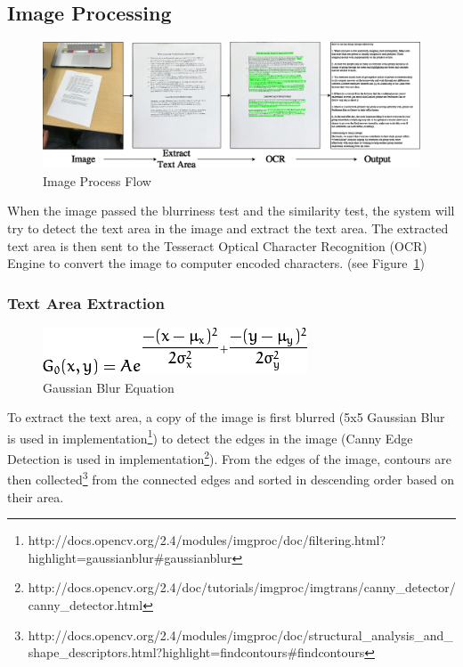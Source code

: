 \subsection{Image Processing}
\begin{figure}
	\centering
    \includegraphics[scale = 0.4]{ImageProcess.png}
    
    \caption{Image Process Flow}
	\label{imageProcessFlow}
\end{figure}
When the image passed the blurriness test and the similarity test, the system will try to detect the text area in the image and extract the text area. The extracted text area is then sent to the Tesseract Optical Character Recognition (OCR) Engine to convert the image to computer encoded characters. (see Figure~\ref{imageProcessFlow})

\subsubsection{Text Area Extraction}
\begin{figure}
	\centering
    \includegraphics[scale = 1]{gaussianBlur.png}
    
    \caption{Gaussian Blur Equation}
	\label{GaussianBlurEquation}
\end{figure}
To extract the text area, a copy of the image is first blurred (5x5 Gaussian Blur is used in implementation\footnote{http://docs.opencv.org/2.4/modules/imgproc/doc/filtering.html?highlight=gaussianblur\#gaussianblur}) to detect the edges in the image (Canny Edge Detection is used in implementation\footnote{http://docs.opencv.org/2.4/doc/tutorials/imgproc/imgtrans/canny\_detector/canny\_detector.html}). From the edges of the image, contours are then collected\footnote{http://docs.opencv.org/2.4/modules/imgproc/doc/structural\_analysis\_and\_shape\_descriptors.html?highlight=findcontours\#findcontours} from the connected edges and sorted in descending order based on their area.

